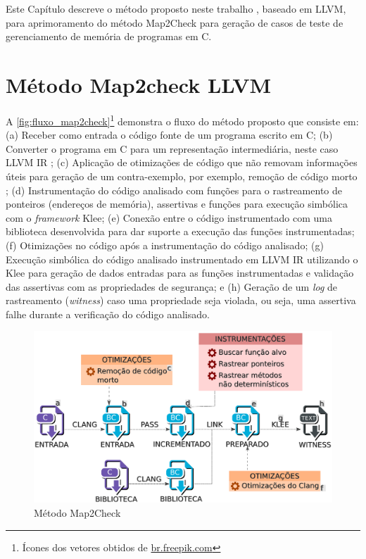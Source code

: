 \label{chapter:metodo}
Este Capítulo descreve o método proposto neste trabalho , baseado em LLVM, para aprimoramento do método Map2Check para geração de casos de teste de gerenciamento de memória de programas em C.

\section{Método Map2check LLVM}

A \autoref{fig:fluxo_map2check}\footnote{Ícones dos vetores obtidos de \url{br.freepik.com}} demonstra o fluxo do método proposto que consiste em: 
(a) Receber como entrada o código fonte de um programa escrito em C; 
(b) Converter o programa em C para um representação intermediária, neste caso LLVM IR \cite{Lattner:2004}; 
(c) Aplicação de otimizações de código que não removam informações úteis para geração de um contra-exemplo, por exemplo, remoção de código morto \cite{Lattner:2004}; 
(d) Instrumentação do código analisado com funções para o rastreamento de ponteiros (endereços de memória), assertivas e funções para execução simbólica com o \textit{framework} Klee; 
(e) Conexão entre o código instrumentado com uma biblioteca desenvolvida para dar suporte a execução das funções instrumentadas; 
(f) Otimizações no código após a instrumentação do código analisado; 
(g) Execução simbólica do código analisado instrumentado em LLVM IR utilizando o Klee para geração de dados entradas para as funções instrumentadas e validação das assertivas com as propriedades de segurança; e 
(h) Geração de um \textit{log} de rastreamento (\textit{witness}) caso uma propriedade seja violada, ou seja, uma assertiva falhe durante a verificação do código analisado. 

\begin{figure}[htb]
	\caption{\label{fig:fluxo_map2check} Método Map2Check}
	\begin{center}
	    \includegraphics[scale=0.35]{resources/fluxo_map2check.png}
	\end{center}
\end{figure}


